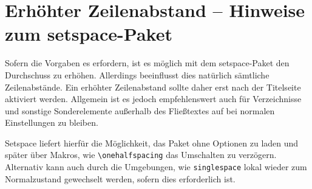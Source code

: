 \documentclass[
	ngerman,
	ruledheaders=chapter,%
	class=book,%
	thesis={
		type=dr,
		dr=rernat
	},
	accentcolor=9c,%
	custommargins=true,%
	marginpar=false,%
	fontsize=11pt,%
]{tudapub}
\let\code\texttt
\let\tbs\textbackslash
\begin{document}
\section{Erhöhter Zeilenabstand -- Hinweise zum setspace-Paket}
Sofern die Vorgaben es erfordern, ist es möglich mit dem setspace-Paket den Durchschuss zu erhöhen. Allerdings beeinflusst dies natürlich sämtliche Zeilenabstände. Ein erhöhter Zeilenabstand sollte daher erst nach der Titelseite aktiviert werden. Allgemein ist es jedoch empfehlenswert auch für Verzeichnisse und sonstige Sonderelemente außerhalb des Fließtextes auf bei normalen Einstellungen zu bleiben.

Setspace liefert hierfür die Möglichkeit, das Paket ohne Optionen zu laden und später über Makros, wie \code{\tbs{}onehalfspacing} das Umschalten zu verzögern. Alternativ kann auch durch die Umgebungen, wie \code{singlespace} lokal wieder zum Normalzustand gewechselt werden, sofern dies erforderlich ist.

\printbibliography
\end{document}
